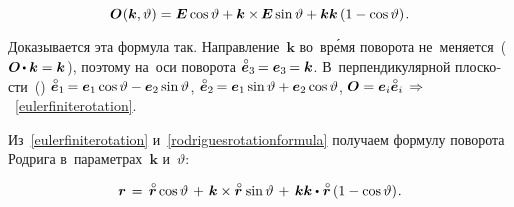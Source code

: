 \nopagebreak\vspace{-0.1em}\begin{equation}\label{eulerfiniterotation}
\bm{O}\hspace{.1ex}(\bm{k}, \vartheta) = \bm{E} \operatorname{cos} \vartheta + \bm{k} \times\hspace{-0.2ex} \bm{E} \operatorname{sin} \vartheta + \bm{k} \bm{k} \left( {1 - \operatorname{cos} \vartheta} \right)
\hspace{-0.2ex} .
\end{equation}

\begin{otherlanguage}{russian}

\vspace{-0.1em}
Доказывается эта формула так.
Направление~${\bm{k}}$
во~вр\'{е}мя поворота
не~меняется~(${\rotationtensor \hspace{-0.2ex}\dotp \bm{k} = \bm{k}\hspace{.12ex}}$), поэтому на~оси поворота ${\mathcircabove{\bm{e}}_3 \hspace{-0.2ex} = \bm{e}_3 \hspace{-0.2ex} = \bm{k}}$.
В~перпендикулярной плоскости~() ${\mathcircabove{\bm{e}}_1 \hspace{-0.2ex} = \bm{e}_1 \operatorname{cos} \vartheta - \bm{e}_2 \operatorname{sin} \vartheta}$, ${\mathcircabove{\bm{e}}_2 \hspace{-0.2ex} = \bm{e}_1 \operatorname{sin} \vartheta + \bm{e}_2 \operatorname{cos} \vartheta}$, ${\rotationtensor = \bm{e}_i \mathcircabove{\bm{e}}_i \,\Rightarrow\hspace{.2ex}}$~\eqref{eulerfiniterotation}.



Из~\eqref{eulerfiniterotation} и~\eqref{rodriguesrotationformula} получаем формулу поворота Родрига в~параметрах~$\bm{k}$ и~$\vartheta$:

\nopagebreak\vspace{-0.3em}\begin{equation*}
\locationvector \hspace{.3ex}
= \hspace{.4ex} \initiallocationvector \operatorname{cos} \vartheta \hspace{.3ex} + \hspace{.3ex} \bm{k} \times \initiallocationvector \hspace{.2ex} \operatorname{sin} \vartheta \hspace{.3ex} + \hspace{.4ex} \bm{k} \bm{k} \dotp \hspace{.1ex} \initiallocationvector \left({1 - \operatorname{cos} \vartheta}\right)
\hspace{-0.25ex} .
\end{equation*}


\end{otherlanguage}
